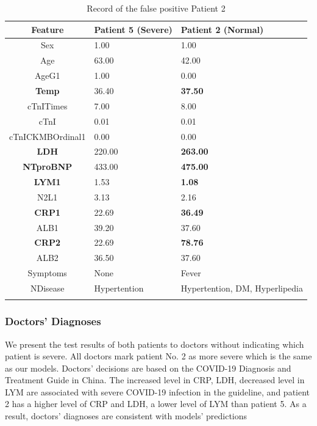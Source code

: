 \begin{table}[H]
\centering
\caption{Record of the false positive Patient 2}
\begin{tabular}{cp{2.2cm}p{2.1cm}}
\toprule
Feature   & Patient 5 (Severe) & Patient 2 (Normal)\\ 
\midrule
Sex                 &   1.00    &   1.00 \\
Age                 &   63.00   &   42.00 \\
AgeG1               &   1.00    &   0.00 \\
\textbf{Temp}       &   36.40   &   \textbf{37.50} \\
cTnITimes           &   7.00    &   8.00 \\
cTnI                &   0.01    &   0.01 \\
cTnICKMBOrdinal1    &  0.00     &   0.00 \\
\textbf{LDH}        &  220.00   &   \textbf{263.00} \\
\textbf{NTproBNP}   &  433.00   &   \textbf{475.00} \\
\textbf{LYM1}       &  1.53     &   \textbf{1.08} \\
N2L1                &  3.13     &   2.16 \\
\textbf{CRP1}       &  22.69    &   \textbf{36.49} \\
ALB1                &  39.20    &   37.60 \\
\textbf{CRP2}       &  22.69    &   \textbf{78.76} \\
ALB2                &  36.50    &   37.60 \\
Symptoms            &  None     &   Fever \\
NDisease            & Hypertention & Hypertention, DM, Hyperlipedia \\
\bottomrule
\label{tab:normal2}
\end{tabular}
\end{table}

\newpage
\subsubsection{\textbf{Doctors' Diagnoses}}

We present the test results of both patients to doctors without indicating which patient is severe. All doctors mark patient No. 2 as more severe which is the same as our models. Doctors' decisions are based on the COVID-19 Diagnosis and Treatment Guide in China. The increased level in CRP, LDH, decreased level in LYM are associated with severe COVID-19 infection in the guideline, and patient 2 has a higher level of CRP and LDH, a lower level of LYM than patient 5. As a result, doctors' diagnoses are consistent with models' predictions

